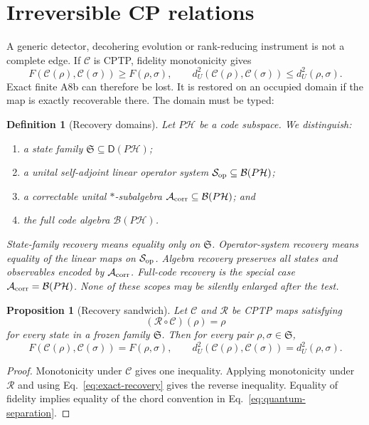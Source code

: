\documentclass[11pt]{article}
\newtheorem{definition}{Definition}
\newtheorem{proposition}{Proposition}
\begin{document}
\section{Irreversible CP relations}

A generic detector, decohering evolution or rank-reducing instrument is not a
complete edge.  If \(\mathcal C\) is CPTP, fidelity monotonicity gives
\begin{equation}
 F(\mathcal C(\rho),\mathcal C(\sigma))\geq F(\rho,\sigma),
 \qquad
 d_U^2(\mathcal C(\rho),\mathcal C(\sigma))
 \leq d_U^2(\rho,\sigma).
 \label{eq:cp-contraction}
\end{equation}
Exact finite A8b can therefore be lost.  It is restored on an occupied
domain if the map is exactly recoverable there.  The domain must be typed:

\begin{definition}[Recovery domains]
Let \(P\mathcal H\) be a code subspace.  We distinguish:
\begin{enumerate}[label=(R\arabic*)]
 \item a state family \(\mathfrak S\subseteq\mathsf D(P\mathcal H)\);
 \item a unital self-adjoint linear operator system
 \(\mathcal S_{\rm op}\subseteq\mathcal B(P\mathcal H)\);
 \item a correctable unital \(*\)-subalgebra
 \(\mathcal A_{\rm corr}\subseteq\mathcal B(P\mathcal H)\); and
 \item the full code algebra \(\mathcal B(P\mathcal H)\).
\end{enumerate}
State-family recovery means equality only on \(\mathfrak S\).  Operator-system
recovery means equality of the linear maps on \(\mathcal S_{\rm op}\).
Algebra recovery preserves all states and observables encoded by
\(\mathcal A_{\rm corr}\).  Full-code recovery is the special case
\(\mathcal A_{\rm corr}=\mathcal B(P\mathcal H)\).  None of these scopes may be
silently enlarged after the test.
\end{definition}

\begin{proposition}[Recovery sandwich]
Let \(\mathcal C\) and \(\mathcal R\) be CPTP maps satisfying
\begin{equation}
 (\mathcal R\circ\mathcal C)(\rho)=\rho
 \label{eq:exact-recovery}
\end{equation}
for every state in a frozen family \(\mathfrak S\).  Then for every pair
\(\rho,\sigma\in\mathfrak S\),
\begin{equation}
 F(\mathcal C(\rho),\mathcal C(\sigma))=F(\rho,\sigma),
 \qquad
 d_U^2(\mathcal C(\rho),\mathcal C(\sigma))=d_U^2(\rho,\sigma).
 \label{eq:recovery-isometry}
\end{equation}
\end{proposition}
\begin{proof}
Monotonicity under \(\mathcal C\) gives one inequality.  Applying monotonicity
under \(\mathcal R\) and using Eq.~\eqref{eq:exact-recovery} gives the reverse
inequality.  Equality of fidelity implies equality of the chord convention in
Eq.~\eqref{eq:quantum-separation}.
\end{proof}
\end{document}
